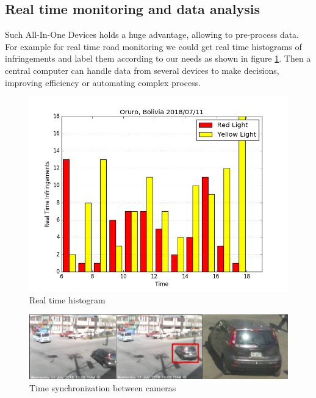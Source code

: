 \documentclass[fleqn,12pt]{SelfArx} %
\begin{document}
\subsection{Real time monitoring and data analysis}

Such All-In-One Devices holds a huge advantage, allowing to pre-process data. For example for real time road monitoring we could get real time histograms of infringements and label them according to our needs as shown in figure \ref{fig:histogram}. Then a central computer can handle data from several devices to make decisions, improving efficiency or automating complex process.

\begin{figure}[t]\centering
	\includegraphics[width=\linewidth]{images/histogram}
	\caption{Real time histogram}
	\label{fig:histogram}
\end{figure}

\begin{figure}[ht]\centering %
	\includegraphics[width=\linewidth]{images/sync}
	\caption{Time synchronization between cameras}
	\label{fig:sync}
\end{figure}
\end{document}
